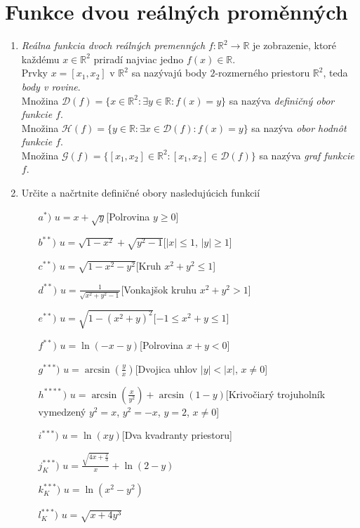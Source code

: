 \section{Funkce dvou reálných proměnných}

\begin{enumerate}

\item \textit{Reálna funkcia dvoch reálných premenných} $f:\mathbb{R}^2 \to \mathbb{R}$ je zobrazenie, ktoré každému $x \in \mathbb{R}^2$ priradí najviac jedno $f(x) \in \mathbb{R}$. \\
Prvky $x=[x_1,x_2]$ v $\mathbb{R}^2$ sa nazývajú body $2$-rozmerného priestoru $\mathbb{R}^2$, teda \textit{body v rovine}.  \\
Množina $\mathcal{D}(f)=\{x \in \mathbb{R}^2: \exists y \in \mathbb{R}: f(x)=y\}$ sa nazýva \textit{definičný obor funkcie $f$}.\\
Množina $\mathcal{H}(f)=\{y \in \mathbb{R}: \exists x \in \mathcal{D}(f): f(x)=y\}$ sa nazýva \textit{obor hodnôt funkcie $f$}.\\
Množina $\mathcal{G}(f)=\{[x_1,x_2] \in \mathbb{R}^2: [x_1,x_2] \in \mathcal{D}(f)\}$ sa nazýva \textit{graf funkcie $f$}.


\item Určite a načrtnite definičné obory nasledujúcich funkcií

\begin{enumerate}
\item[$a^{*})$]{$u=x+\sqrt{y}$}\hspace{\fill}[Polrovina $y\geq0$]
\item[$b^{**})$]{$u=\sqrt{1-x^2}+\sqrt{y^2-1}$}\hspace{\fill}[$|x|\leq 1$, $|y|\geq 1$]
\item[$c^{**})$]{$u=\sqrt{1-x^2-y^2}$}\hspace{\fill}[Kruh $x^2+y^2 \leq 1$]
\item[$d^{**})$]{$u=\frac{1}{\sqrt{x^2+y^2-1}}$}\hspace{\fill}[Vonkajšok kruhu $x^2+y^2>1$]
\item[$e^{**})$]{$u=\sqrt{1-(x^2+y)^2}$}\hspace{\fill}[$-1\leq x^2+y \leq 1$]
\item[$f^{**})$]{$u=\ln(-x-y)$}\hspace{\fill}[Polrovina $x+y < 0$]
\item[$g^{***})$]{$u=\arcsin(\frac{y}{x})$}\hspace{\fill}[Dvojica uhlov $|y|<|x|$, $x\neq 0$]
\item[$h^{****})$]{$u=\arcsin(\frac{x}{y^2})+\arcsin(1-y)$}\hspace{\fill}[Krivočiarý trojuholník vymedzený $y^2=x$, $y^2=-x$, $y=2$, $x \neq 0$]
\item[$i^{***})$]{$u=\ln(xy)$}\hspace{\fill}[Dva kvadranty priestoru]
\item[$j_K^{***})$]{$u=\frac{\sqrt{4x+\frac{2}{3}}}{x}+\ln(2-y)$}
\item[$k_K^{***})$]{$u=\ln(x^2-y^2)$}
\item[$l_K^{***})$]{$u=\sqrt{x+4y^3}$}
\end{enumerate}


\end{enumerate}
